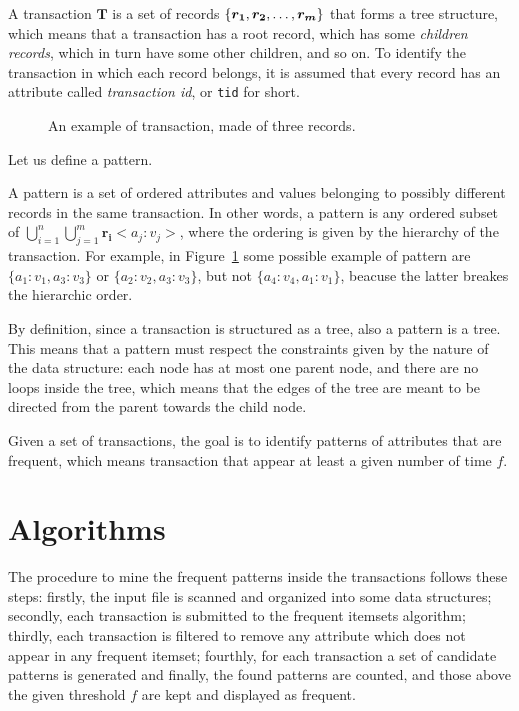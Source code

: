 \documentclass{acm_proc_article-sp-sigmod09}
\begin{document}
A transaction $\boldsymbol{T}$ is a set of records $\{\boldsymbol{r_1}, \boldsymbol{r_2}, \text{\dots}, \boldsymbol{r_m}\}$ that forms a tree structure, which means that a transaction has a root record, which has some \emph{children records}, which in turn have some other children, and so on. To identify the transaction in which each record belongs, it is assumed that every record has an attribute called \emph{transaction id}, or \texttt{tid} for short.

\begin{figure}
\centering
{}
\caption{An example of transaction, made of three records.}
\label{fig:transaction}
\end{figure}

Let us define a pattern.
\begin{definition}
A pattern is a set of ordered attributes and values belonging to possibly different records in the same transaction. In other words, a pattern is any ordered subset of $\bigcup\limits_{i=1}^{n} \bigcup\limits_{j=1}^{m} \boldsymbol{r_i}<a_j \colon v_j>$, where the ordering is given by the hierarchy of the transaction. For example, in Figure~\ref{fig:transaction} some possible example of pattern are $\{a_1 \colon v_1, a_3 \colon v_3\}$ or $\{a_2 \colon v_2, a_3 \colon v_3\}$, but not $\{a_4 \colon v_4, a_1 \colon v_1\}$, beacuse the latter breakes the hierarchic order.

By definition, since a transaction is structured as a tree, also a pattern is a tree. This means that a pattern must respect the constraints given by the nature of the data structure: each node has at most one parent node, and there are no loops inside the tree, which means that the edges of the tree are meant to be directed from the parent towards the child node.
\end{definition}

Given a set of transactions, the goal is to identify patterns of attributes that are frequent, which means transaction that appear at least a given number of time $f$.

\section{Algorithms}
\label{sec:alg}
The procedure to mine the frequent patterns inside the transactions follows these steps: firstly, the input file is scanned and organized into some data structures; secondly, each transaction is submitted to the frequent itemsets algorithm; thirdly, each transaction is filtered to remove any attribute which does not appear in any frequent itemset; fourthly, for each transaction a set of candidate patterns is generated and finally, the found patterns are counted, and those above the given threshold $f$ are kept and displayed as frequent.
\end{document}
